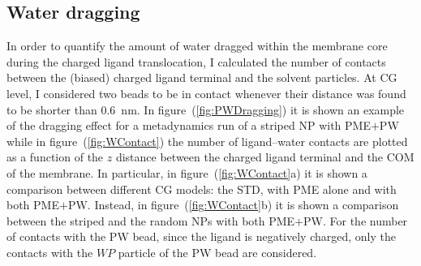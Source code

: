 \subsection{Water dragging}
\label{sec:WDragging}
In order to quantify the amount of water dragged within the membrane core during the charged ligand translocation, I calculated the number of contacts between the (biased) charged ligand terminal and the solvent particles. At \ac{CG} level, I considered two beads to be in contact whenever their distance was found to be shorter than $0.6$~nm. In figure~(\ref{fig:PWDragging}) it is shown an example of the dragging effect for a metadynamics run of a striped \ac{NP} with \ac{PME}$+$\ac{PW} while in figure~(\ref{fig:WContact}) the number of ligand--water contacts are plotted as a function of the $z$ distance between the charged ligand terminal and the \ac{COM} of the membrane. In particular, in figure~(\ref{fig:WContact}a) it is shown a comparison between different \ac{CG} \martini models: the \ac{STD}, with \ac{PME} alone and with both \ac{PME}$+$\ac{PW}. Instead, in figure~(\ref{fig:WContact}b) it is shown a comparison between the striped and the random \acp{NP} with both \ac{PME}$+$\ac{PW}. For the number of contacts with the \ac{PW} bead, since the ligand is negatively charged, only the contacts with the $WP$ particle of the \ac{PW} bead are considered.

